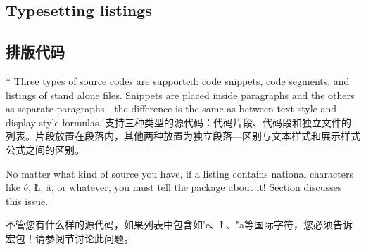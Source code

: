 
\begin{paracol}{2}
\subsection{Typesetting listings}
\switchcolumn
\subsection{排版代码}
\switchcolumn[0]*%
Three types of source codes are supported: code snippets, code segments, and
listings of stand alone files.  Snippets are placed inside paragraphs and the
others as separate paragraphs---the difference is the same as between text
style and display style formulas.
\switchcolumn
支持三种类型的源代码：代码片段、代码段和独立文件的列表。片段放置在段落内，其他两种放置为独立段落---区别与文本样式和展示样式公式之间的区别。
\end{paracol}
\begin{advise}
\begin{paracol}{2}

\item No matter what kind of source you have, if a listing contains national
    characters like \'e, \L, \"a, or whatever, you must tell the
    package about it! Section  discusses this issue.
    \switchcolumn
    \item 不管您有什么样的源代码，如果列表中包含如'e、\L、"a等国际字符，您必须告诉宏包！请参阅节讨论此问题。      
\end{paracol}
\end{advise}

